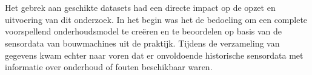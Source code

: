 



\section{}%
\label{sec: Impact op het onderzoek}

Het gebrek aan geschikte datasets had een directe impact op de opzet en uitvoering van dit onderzoek. In het begin was het de bedoeling om een complete voorspellend onderhoudsmodel te creëren en te beoordelen op basis van de sensordata van bouwmachines uit de praktijk. Tijdens de verzameling van gegevens kwam echter naar voren dat er onvoldoende historische sensordata met informatie over onderhoud of fouten beschikbaar waren.

